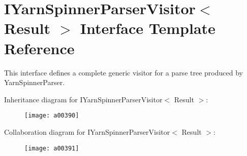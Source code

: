 \hypertarget{a00119}{\section{I\-Yarn\-Spinner\-Parser\-Visitor$<$ Result $>$ Interface Template Reference}
\label{a00119}
}


This interface defines a complete generic visitor for a parse tree produced by Yarn\-Spinner\-Parser.  




Inheritance diagram for I\-Yarn\-Spinner\-Parser\-Visitor$<$ Result $>$\-:
\nopagebreak
\begin{figure}[H]
\begin{center}
\leavevmode
\texttt{[image: a00390]}
\end{center}
\end{figure}


Collaboration diagram for I\-Yarn\-Spinner\-Parser\-Visitor$<$ Result $>$\-:
\nopagebreak
\begin{figure}[H]
\begin{center}
\leavevmode
\texttt{[image: a00391]}
\end{center}
\end{figure}
